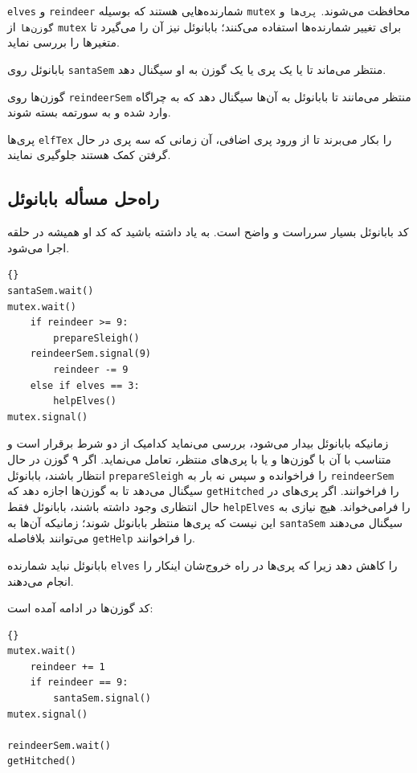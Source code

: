 \documentclass{book}
\newcommand{\clearemptydoublepage}{\newpage\cleardoublepage}
\begin{document}
    {\tt elves} و {\tt reindeer} شمارنده‌هایی هستند که بوسیله {\tt mutex} محافظت می‌شوند. 
    {\tt پری‌ها} و {\tt گوزن‌‌ها} از {\tt mutex} برای تغییر شمارنده‌ها استفاده می‌کنند؛‌ بابانوئل نیز آن را می‌گیرد تا متغیرها را بررسی نماید.

    بابانوئل روی  {\tt santaSem} منتظر می‌ماند تا یا یک پری یا یک گوزن به او سیگنال دهد. 

    گوزن‌ها روی {\tt reindeerSem} منتظر می‌مانند تا بابانوئل به آن‌ها سیگنال دهد که به چراگاه وارد شده و به سورتمه بسته شوند. 

    پری‌ها {\tt elfTex} را بکار می‌برند تا از ورود پری اضافی، آن زمانی که سه پری در حال گرفتن کمک هستند جلوگیری نمایند. 


\clearemptydoublepage
\subsection{راه‌حل مسأله بابانوئل}

    کد بابانوئل بسیار سرراست و واضح است. به یاد داشته باشید که کد او همیشه در حلقه اجرا می‌شود. 

\begin{latin}
\begin{lstlisting}[title=\rl{راه‌حل مسأله بابانوئل (بابانوئل)}]{}
santaSem.wait()
mutex.wait()
    if reindeer >= 9:
        prepareSleigh()
	reindeerSem.signal(9)
        reindeer -= 9
    else if elves == 3:
        helpElves()
mutex.signal()
\end{lstlisting}
\end{latin}

    زمانیکه بابانوئل بیدار می‌شود، بررسی می‌نماید کدامیک از دو شرط برقرار است و متناسب با آن با گوزن‌ها  و یا با پری‌های منتظر، تعامل می‌نماید. 
    اگر ۹ گوزن در حال انتظار باشند، بابانوئل  {\tt prepareSleigh} را فراخوانده و سپس نه بار به {\tt reindeerSem} سیگنال می‌دهد تا به گوزن‌ها
    اجازه دهد که {\tt getHitched} را فراخوانند. اگر پری‌های در حال انتظاری وجود داشته باشند، بابانوئل فقط {\tt helpElves} را فرامی‌خواند. 
    هیچ نیازی به این نیست که پری‌ها منتظر بابانوئل شوند؛ زمانیکه آن‌ها به {\tt santaSem} سیگنال می‌دهند می‌توانند بلافاصله  {\tt getHelp}  را فراخوانند. 

    بابانوئل نباید شمارنده {\tt elves} را کاهش دهد زیرا که پری‌ها در راه خروج‌شان اینکار را انجام می‌دهند. 

    کد گوزن‌ها در ادامه آمده است: 

\begin{latin}
\begin{lstlisting}[title=\rl{راه‌حل مسأله بابانوئل (گوزن‌ها)}]{}
mutex.wait()
    reindeer += 1
    if reindeer == 9:
        santaSem.signal()
mutex.signal()

reindeerSem.wait()
getHitched()
\end{lstlisting}
\end{latin}
\end{document}
